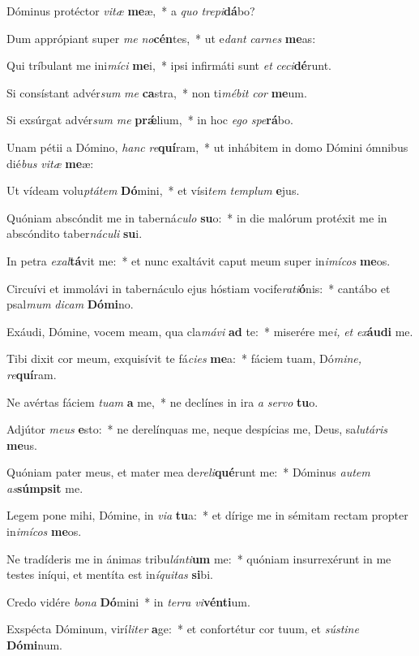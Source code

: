 \item Dóminus proté\-ctor \textit{vitæ} \textbf{me}æ,~* a \textit{quo} \textit{trepi}\textbf{dá}bo?
\item Dum apprópiant super \textit{me} \textit{no}\textbf{cén}tes,~* ut e\tinyhspace\textit{dant} \textit{carnes} \textbf{me}as:
\item Qui tríbulant me ini\textit{míci} \textbf{me}i,~* ipsi infirmáti sunt \textit{et} \textit{ceci}\textbf{dé}runt.
\item Si consístant advér\tinyhspace\textit{sum} \textit{me} \textbf{ca}stra,~* non ti\textit{mébit} \textit{cor} \textbf{me}um.
\item Si exsúrgat advér\textit{sum} \textit{me} \textbf{prǽ}lium,~* in hoc \textit{ego} \textit{spe}\textbf{rá}bo.
\item Unam pétii a Dómino, \textit{hanc} \textit{re}\textbf{quí}ram,~* ut inhábitem in domo Dómini ómnibus dié\tinyhspace\textit{bus} \textit{vitæ} \textbf{me}æ:
\item Ut vídeam volu\tinyhspace\textit{ptátem} \textbf{Dó}mini,~* et vísi\textit{tem} \textit{templum} \textbf{e}jus.
\item Quóniam abscóndit me in taberná\textit{culo} \textbf{su}o:~* in die malórum protéxit me in abscóndito taber\textit{náculi} \textbf{su}i.
\item In petra \textit{exal}\textbf{tá}vit me:~* et nunc exaltávit caput meum super in\tinyhspace\textit{imícos} \textbf{me}os.
\item Circuívi et immolávi in tabernáculo ejus hóstiam vocife\textit{rati}\textbf{ó}nis:~* cantábo et psal\textit{mum} \textit{dicam} \textbf{Dó}\textbf{mi}no.
\item Exáudi, Dómine, vocem meam, qua cla\textit{mávi} \textbf{ad} te:~* miserére me\textit{i,} \textit{et} \textit{ex}\textbf{áu}\textbf{di} me.
\item Tibi dixit cor meum, exquisívit te fá\textit{cies} \textbf{me}a:~* fáciem tuam, Dó\textit{mine,} \textit{re}\textbf{quí}ram.
\item Ne avértas fáciem \textit{tuam} \textbf{a} me,~* ne declínes in ira \textit{a} \textit{servo} \textbf{tu}o.
\item Adjútor \textit{meus} \textbf{e}sto:~* ne derelínquas me, neque despícias me, Deus, sa\spurhspace\textit{lutáris} \textbf{me}us.
\item Quóniam pater meus, et mater mea de\textit{reli}\textbf{qué}runt me:~* Dóminus \textit{autem} \textit{as}\textbf{súm}\textbf{psit} me.
\item Legem pone mihi, Dómine, in \textit{via} \textbf{tu}a:~* et dírige me in sémitam re\-ctam pro\-pter in\spurhspace\textit{imícos} \textbf{me}os.
\item Ne tradíderis me in ánimas tribu\spurhspace\textit{lánti}\textbf{um} me:~* quóniam insurrexérunt in me testes iníqui, et mentíta est in\tinyhspace\textit{íquitas} \textbf{si}bi.
\item Credo vidére \textit{bona} \textbf{Dó}mini~* in \textit{terra} \textit{vi}\textbf{vén}\textbf{ti}um.
\item Exspé\-cta Dóminum, virí\tinyhspace\textit{liter} \textbf{a}ge:~* et confortétur cor tuum, et \textit{sústine} \textbf{Dó}\textbf{mi}num.
